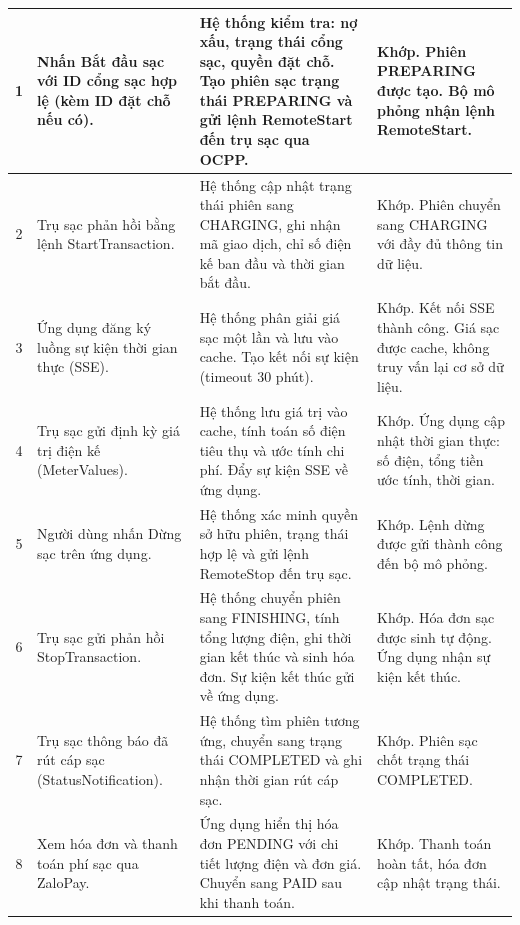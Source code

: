 \begin{center}
\begin{longtable}{|c|>{\raggedright\arraybackslash}m{}|>{\raggedright\arraybackslash}m{}|>{\raggedright\arraybackslash}m{}|}
        1 & Nhấn Bắt đầu sạc với ID cổng sạc hợp lệ (kèm ID đặt chỗ nếu có). & Hệ thống kiểm tra: nợ xấu, trạng thái cổng sạc, quyền đặt chỗ. Tạo phiên sạc trạng thái PREPARING và gửi lệnh RemoteStart đến trụ sạc qua OCPP. & Khớp. Phiên PREPARING được tạo. Bộ mô phỏng nhận lệnh RemoteStart. \\
        \hline
        2 & Trụ sạc phản hồi bằng lệnh StartTransaction. & Hệ thống cập nhật trạng thái phiên sang CHARGING, ghi nhận mã giao dịch, chỉ số điện kế ban đầu và thời gian bắt đầu. & Khớp. Phiên chuyển sang CHARGING với đầy đủ thông tin dữ liệu. \\
        \hline
        3 & Ứng dụng đăng ký luồng sự kiện thời gian thực (SSE). & Hệ thống phân giải giá sạc một lần và lưu vào cache. Tạo kết nối sự kiện (timeout 30 phút). & Khớp. Kết nối SSE thành công. Giá sạc được cache, không truy vấn lại cơ sở dữ liệu. \\
        \hline
        4 & Trụ sạc gửi định kỳ giá trị điện kế (MeterValues). & Hệ thống lưu giá trị vào cache, tính toán số điện tiêu thụ và ước tính chi phí. Đẩy sự kiện SSE về ứng dụng. & Khớp. Ứng dụng cập nhật thời gian thực: số điện, tổng tiền ước tính, thời gian. \\
        \hline
        5 & Người dùng nhấn Dừng sạc trên ứng dụng. & Hệ thống xác minh quyền sở hữu phiên, trạng thái hợp lệ và gửi lệnh RemoteStop đến trụ sạc. & Khớp. Lệnh dừng được gửi thành công đến bộ mô phỏng. \\
        \hline
        6 & Trụ sạc gửi phản hồi StopTransaction. & Hệ thống chuyển phiên sang FINISHING, tính tổng lượng điện, ghi thời gian kết thúc và sinh hóa đơn. Sự kiện kết thúc gửi về ứng dụng. & Khớp. Hóa đơn sạc được sinh tự động. Ứng dụng nhận sự kiện kết thúc. \\
        \hline
        7 & Trụ sạc thông báo đã rút cáp sạc (StatusNotification). & Hệ thống tìm phiên tương ứng, chuyển sang trạng thái COMPLETED và ghi nhận thời gian rút cáp sạc. & Khớp. Phiên sạc chốt trạng thái COMPLETED. \\
        \hline
        8 & Xem hóa đơn và thanh toán phí sạc qua ZaloPay. & Ứng dụng hiển thị hóa đơn PENDING với chi tiết lượng điện và đơn giá. Chuyển sang PAID sau khi thanh toán. & Khớp. Thanh toán hoàn tất, hóa đơn cập nhật trạng thái. \\
        \hline
    \end{longtable}
\end{center}

